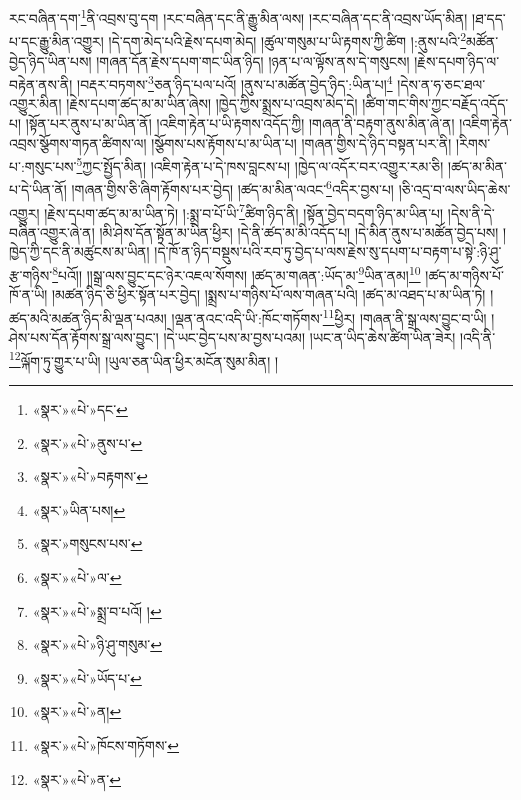 རང་བཞིན་དག་\footnote{«སྣར་»«པེ་»དང་}ནི་འབྲས་བུ་དག །རང་བཞིན་དང་ནི་རྒྱུ་མིན་ལས། །རང་བཞིན་དང་ནི་འབྲས་ཡོད་མིན། །ཐ་དད་པ་དང་རྒྱུ་མིན་འགྱུར། །དེ་དག་མེད་པའི་རྗེས་དཔག་མེད། །ཚུལ་གསུམ་པ་ཡི་རྟགས་ཀྱི་ཚིག །:ནུས་པའི་\footnote{«སྣར་»«པེ་»ནུས་པ་}མཚོན་བྱེད་ཉིད་ཡིན་པས། །གཞན་དོན་རྗེས་དཔག་གང་ཡིན་ཉིད། །ཉན་པ་ལ་ལྟོས་ནས་དེ་གསུངས། །རྗེས་དཔག་ཉིད་ལ་བརྟེན་ནས་ནི། །བརྡར་བཏགས་\footnote{«སྣར་»«པེ་»བརྟགས་}ཅན་ཉིད་པལ་པའོ། །ནུས་པ་མཚོན་བྱེད་ཉིད་:ཡིན་པ།\footnote{«སྣར་»ཡིན་པས།} །དེས་ན་ཧ་ཅང་ཐལ་འགྱུར་མིན། །རྗེས་དཔག་ཚད་མ་མ་ཡིན་ཞེས། །ཁྱེད་ཀྱིས་སྨྲས་པ་འབྲས་མེད་དེ། །ཚིག་གང་གིས་ཀྱང་བརྗོད་འདོད་པ། །སྟོན་པར་ནུས་པ་མ་ཡིན་ནོ། །འཇིག་རྟེན་པ་ཡི་རྟགས་འདོད་ཀྱི། །གཞན་ནི་བརྟག་ནུས་མིན་ཞེ་ན། །འཇིག་རྟེན་འབྲས་སྩོགས་གཏན་ཚིགས་ལ། །སྩོགས་པས་རྟོགས་པ་མ་ཡིན་པ། །གཞན་གྱིས་དེ་ཉིད་བསྟན་པར་ནི། །རིགས་པ་:གསུང་པས་\footnote{«སྣར་»གསུངས་པས་}ཀྱང་སྤྱོད་མིན། །འཇིག་རྟེན་པ་དེ་ཁས་བླངས་པ། །ཁྱེད་ལ་འདོར་བར་འགྱུར་རམ་ཅི། །ཚད་མ་མིན་པ་དེ་ཡིན་ནོ། །གཞན་གྱིས་ཅི་ཞིག་རྟོགས་པར་བྱེད། །ཚད་མ་མིན་ལའང་\footnote{«སྣར་»«པེ་»ལ་}འདིར་བྱས་པ། །ཅི་འདྲ་བ་ལས་ཡིད་ཆེས་འགྱུར། །རྗེས་དཔག་ཚད་མ་མ་ཡིན་ཏེ། །:སྨྲ་བ་པོ་ཡི་\footnote{«སྣར་»«པེ་»སྨྲ་བ་པའོ། །}ཚིག་ཉིད་ནི། །སྟོན་བྱེད་བདག་ཉིད་མ་ཡིན་པ། །དེས་ནི་དེ་བཞིན་འགྱུར་ཞེ་ན། །མི་ཤེས་དོན་སྟོན་མ་ཡིན་ཕྱིར། །དེ་ནི་ཚད་མ་མི་འདོད་པ། །དེ་མིན་ནུས་པ་མཚོན་བྱེད་པས། །ཁྱེད་ཀྱི་དང་ནི་མཚུངས་མ་ཡིན། །དེ་ཁོ་ན་ཉིད་བསྡུས་པའི་རབ་ཏུ་བྱེད་པ་ལས་རྗེས་སུ་དཔག་པ་བརྟག་པ་སྟེ་:ཉི་ཤུ་རྩ་གཉིས་\footnote{«སྣར་»«པེ་»ཉི་ཤུ་གསུམ་}པའོ།། །།སྒྲ་ལས་བྱུང་དང་ཉེར་འཇལ་སོགས། །ཚད་མ་གཞན་:ཡོད་མ་\footnote{«སྣར་»«པེ་»ཡོད་པ་}ཡིན་ནམ།\footnote{«སྣར་»«པེ་»ན།} །ཚད་མ་གཉིས་པོ་ཁོ་ན་ཡི། །མཚན་ཉིད་ཅི་ཕྱིར་སྟོན་པར་བྱེད། །སྨྲས་པ་གཉིས་པོ་ལས་གཞན་པའི། །ཚད་མ་འཐད་པ་མ་ཡིན་ཏེ། །ཚད་མའི་མཚན་ཉིད་མི་ལྡན་པའམ། །ལྡན་ནའང་འདི་ཡི་:ཁོང་གཏོགས་\footnote{«སྣར་»«པེ་»ཁོངས་གཏོགས་}ཕྱིར། །གཞན་ནི་སྒྲ་ལས་བྱུང་བ་ཡི། །ཤེས་པས་དོན་རྟོགས་སྒྲ་ལས་བྱུང་། །དེ་ཡང་བྱེད་པས་མ་བྱས་པའམ། །ཡང་ན་ཡིད་ཆེས་ཚིག་ཡིན་ཟེར། །འདི་ནི་\footnote{«སྣར་»«པེ་»ན་}ལྐོག་ཏུ་གྱུར་པ་ཡི། །ཡུལ་ཅན་ཡིན་ཕྱིར་མངོན་སུམ་མིན། །
